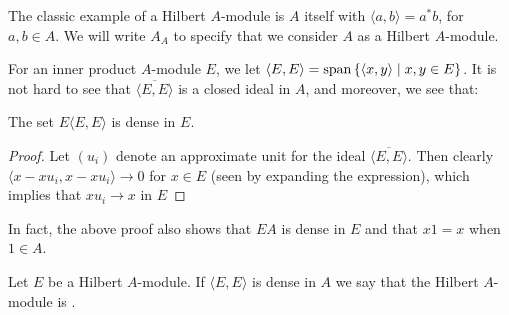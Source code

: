 \begin{example}
	The classic example of a Hilbert $A$-module is $A$ itself with $\langle a,b \rangle = a^*b$, for $a,b \in A$. We will write $A_A$ to specify that we consider $A$ as a Hilbert $A$-module.
\end{example}

For an inner product $A$-module $E$, we let $\langle E,E \rangle =  \mathrm{span} \left\{ \langle x,y \rangle \mid x,y \in E \right\}$. It is not hard to see that $\overline{\langle E,E \rangle}$ is a closed ideal in $A$, and moreover, we see that:
\begin{lemma}
	The set $E\langle E,E\rangle$ is dense in $E$.
	\label{EEEdense}
\end{lemma}
\begin{proof}
	Let $(u_i)$ denote an approximate unit for the ideal $\overline{\langle E,E \rangle}$. Then clearly $\langle x-x u_i , x-x u_i\rangle \to 0$ for $x \in E$ (seen by expanding the expression), which implies that $x u_i \to x$ in $E$
\end{proof}
In fact, the above proof also shows that $EA$ is dense in $E$ and that $x1=x$ when $1 \in A$.

\begin{definition}
	Let $E$ be a Hilbert $A$-module. If $\langle E,E \rangle$ is dense in $A$ we say that the Hilbert $A$-module is .
\end{definition}

